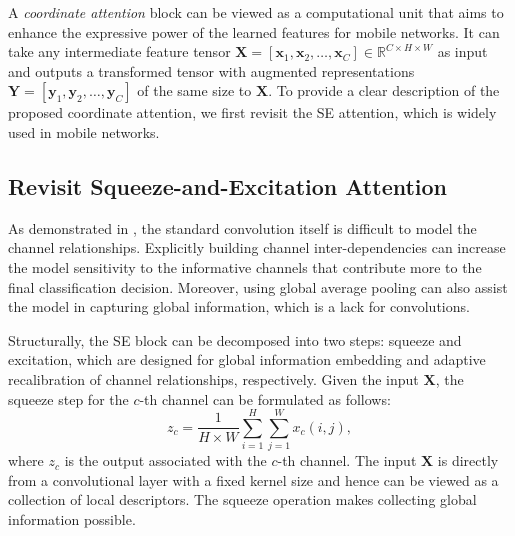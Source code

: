 \documentclass[final]{cvpr}
\begin{document}
A \emph{coordinate attention} block can be viewed  as a computational unit that aims to enhance the expressive power of the learned features for mobile networks.
%
It can take any intermediate feature tensor
$\mathbf{X} = [\mathbf{x}_1, \mathbf{x}_2, \ldots, \mathbf{x}_{C}] \in \mathbb{R}^{C \times H \times W}$ as input
and outputs a transformed tensor with augmented representations
$\mathbf{Y} = [\mathbf{y}_1, \mathbf{y}_2, \ldots, \mathbf{y}_{C}]$ of the same size to $\mathbf{X}$.
%
%
To provide a clear description of the proposed coordinate attention, we first revisit the SE attention, which is widely used in mobile networks.
% 

\subsection{Revisit Squeeze-and-Excitation Attention}

As demonstrated in \cite{hu2018squeeze}, the standard convolution itself is difficult to model the channel relationships.
%
Explicitly building channel inter-dependencies can increase the model sensitivity to the informative channels that contribute more to the final classification decision.
%
Moreover, using global average pooling can also assist the model in capturing global information, which is a lack for convolutions.


Structurally, the SE block can be decomposed into two steps:
squeeze and excitation, which are designed for global information embedding and adaptive recalibration of channel relationships, respectively.
%
Given the input $\mathbf{X}$, the squeeze step for the $c$-th channel can be formulated as follows:
\begin{equation} \label{eqn:gap}
    z_c = \frac{1}{H \times W} \sum_{i=1}^{H}\sum_{j=1}^{W} x_c(i, j),
\end{equation}
where $z_c$ is the output associated with the $c$-th channel.
%
The input $\mathbf{X}$ is directly from a convolutional layer with a fixed kernel size and hence can be viewed as a collection of local descriptors.
%
The squeeze operation makes collecting global information possible.
\end{document}
